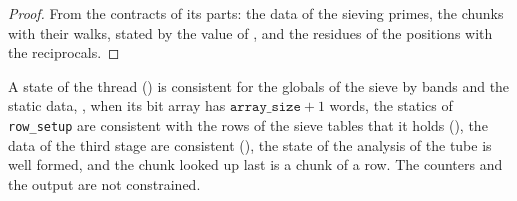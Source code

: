 \begin{proof}
  \leanok
  From the contracts of its parts: the data of the sieving primes, the chunks with their walks,
  stated by the value of , and the residues of the positions with the
  reciprocals.
\end{proof}

\begin{definition}\label{def:SiftState.WF}
  \leanok
  A state of the thread () is consistent for the globals of the sieve by
  bands and the static data, , when its bit array has
  $\texttt{array\_size} + 1$ words, the statics of \texttt{row\_setup} are consistent with the rows
  of the sieve tables that it holds (), the data of the third stage
  are consistent (), the state of the analysis of the tube is well
  formed, and the chunk looked up last is a chunk of a row. The counters and the output are not
  constrained.
\end{definition}


